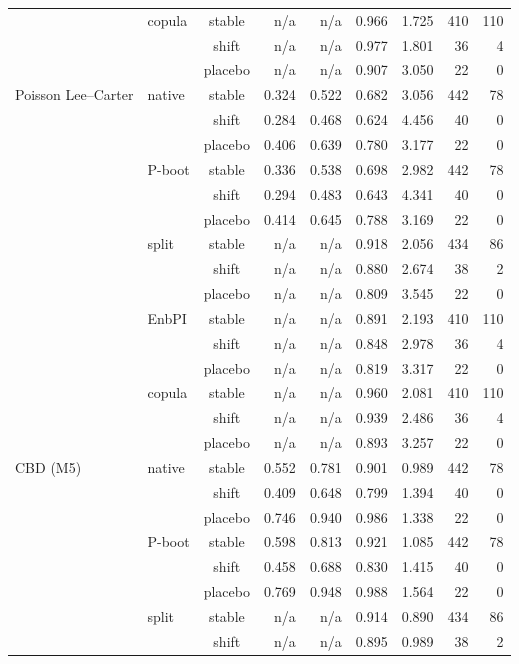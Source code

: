 {\begin{longtable}{@{}llcrrrrrr@{}}
 & copula & stable & n/a & n/a & 0.966 & 1.725 & 410 & 110 \\
 &  & shift & n/a & n/a & 0.977 & 1.801 & 36 & 4 \\
 &  & placebo & n/a & n/a & 0.907 & 3.050 & 22 & 0 \\
\addlinespace[2pt]
Poisson Lee--Carter & native & stable & 0.324 & 0.522 & 0.682 & 3.056 & 442 & 78 \\
 &  & shift & 0.284 & 0.468 & 0.624 & 4.456 & 40 & 0 \\
 &  & placebo & 0.406 & 0.639 & 0.780 & 3.177 & 22 & 0 \\
 & P-boot & stable & 0.336 & 0.538 & 0.698 & 2.982 & 442 & 78 \\
 &  & shift & 0.294 & 0.483 & 0.643 & 4.341 & 40 & 0 \\
 &  & placebo & 0.414 & 0.645 & 0.788 & 3.169 & 22 & 0 \\
 & split & stable & n/a & n/a & 0.918 & 2.056 & 434 & 86 \\
 &  & shift & n/a & n/a & 0.880 & 2.674 & 38 & 2 \\
 &  & placebo & n/a & n/a & 0.809 & 3.545 & 22 & 0 \\
 & EnbPI & stable & n/a & n/a & 0.891 & 2.193 & 410 & 110 \\
 &  & shift & n/a & n/a & 0.848 & 2.978 & 36 & 4 \\
 &  & placebo & n/a & n/a & 0.819 & 3.317 & 22 & 0 \\
 & copula & stable & n/a & n/a & 0.960 & 2.081 & 410 & 110 \\
 &  & shift & n/a & n/a & 0.939 & 2.486 & 36 & 4 \\
 &  & placebo & n/a & n/a & 0.893 & 3.257 & 22 & 0 \\
\addlinespace[2pt]
CBD (M5) & native & stable & 0.552 & 0.781 & 0.901 & 0.989 & 442 & 78 \\
 &  & shift & 0.409 & 0.648 & 0.799 & 1.394 & 40 & 0 \\
 &  & placebo & 0.746 & 0.940 & 0.986 & 1.338 & 22 & 0 \\
 & P-boot & stable & 0.598 & 0.813 & 0.921 & 1.085 & 442 & 78 \\
 &  & shift & 0.458 & 0.688 & 0.830 & 1.415 & 40 & 0 \\
 &  & placebo & 0.769 & 0.948 & 0.988 & 1.564 & 22 & 0 \\
 & split & stable & n/a & n/a & 0.914 & 0.890 & 434 & 86 \\
 &  & shift & n/a & n/a & 0.895 & 0.989 & 38 & 2 \\

\end{longtable}}
